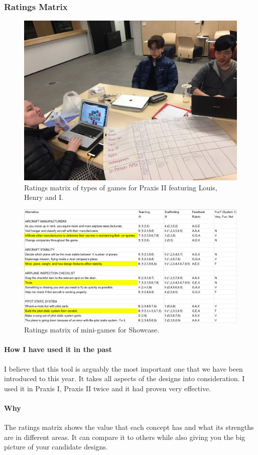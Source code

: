 \documentclass[paper=a4, fontsize=11pt]{article} %
\begin{document}
        \subsubsection{Ratings Matrix}
            \begin{figure}[H]
                \centering
	            \includegraphics[width=0.6\linewidth]{bubblesratings.jpg}
	            \caption{Ratings matrix of types of games for Praxis II featuring Louis, Henry and I.}
            \end{figure}
            \begin{figure}[H]
                \centering
	            \includegraphics[width=1\linewidth]{spreadratings.png}
	            \caption{Ratings matrix of mini-games for Showcase.}
            \end{figure}
            \paragraph{How I have used it in the past}
            \cite{ratmatrix} I believe that this tool is arguably the most important one that we have been introduced to this year. It takes all aspects of the designs into consideration. I used it in Praxis I, Praxis II twice and it had proven very effective. 
            \paragraph{Why} The ratings matrix shows the value that each concept has and what its strengths are in different areas. It can compare it to others while also giving you the big picture of your candidate designs. 
\end{document}
